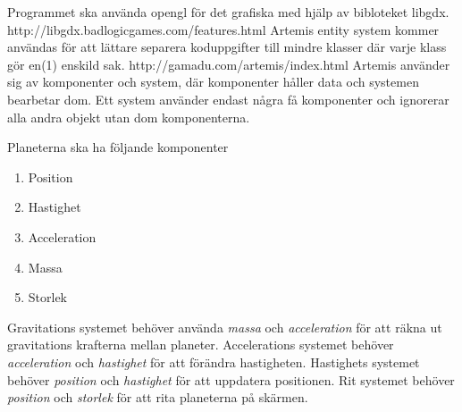 Programmet ska använda opengl för det grafiska med hjälp av bibloteket libgdx. http://libgdx.badlogicgames.com/features.html
Artemis entity system kommer användas för att lättare separera koduppgifter till mindre klasser där varje klass gör en(1) enskild sak. http://gamadu.com/artemis/index.html
Artemis använder sig av komponenter och system, där komponenter håller data och systemen bearbetar dom. Ett system använder endast några få komponenter och ignorerar alla andra objekt utan dom komponenterna.

Planeterna ska ha följande komponenter
\begin{enumerate}
    \item Position
    \item Hastighet
    \item Acceleration
    \item Massa
    \item Storlek
\end{enumerate}

Gravitations systemet behöver använda \textit{massa} och \textit{acceleration} för att räkna ut gravitations krafterna mellan planeter.
Accelerations systemet behöver \textit{acceleration} och \textit{hastighet} för att förändra hastigheten.
Hastighets systemet behöver \textit{position} och \textit{hastighet} för att uppdatera positionen.
Rit systemet behöver \textit{position} och \textit{storlek} för att rita planeterna på skärmen.
